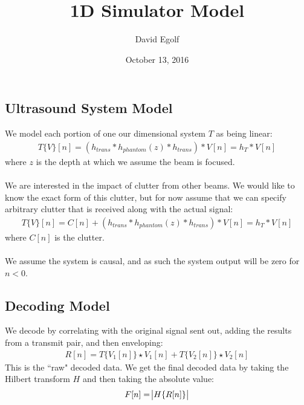 \documentclass[a4paper]{article}
\title{1D Simulator Model}
\author{David Egolf}
\date{October 13, 2016}
\newcommand{\op}[2]{#1\{#2\}}
\begin{document}
\subsection*{Ultrasound System Model}
We model each portion of one our dimensional system $T$ as being linear:
\begin{align*}
\op{T}{V}[n] = (h_{trans} * h_{phantom}(z) * h_{trans}) * V[n] = h_{T} * V[n]
\end{align*}
where $z$ is the depth at which we assume the beam is focused.
\\\\
We are interested in the impact of clutter from other beams. We would like to know the exact form of this clutter, but for now assume that we can specify arbitrary clutter that is received along with the actual signal:
\begin{align*}
\op{T}{V}[n] = C[n] +  (h_{trans} * h_{phantom}(z) * h_{trans}) * V[n] = h_{T} * V[n]
\end{align*}
where $C[n]$ is the clutter.
\\\\
We assume the system is causal, and as such the system output will be zero for $n < 0$.
\subsection*{Decoding Model}
We decode by correlating with the original signal sent out, adding the results from a transmit pair, and then enveloping:
\begin{align*}
R[n]=\op{T}{V_1[n]} \star V_1[n] + \op{T}{V_2[n]} \star V_2[n]
\end{align*}
This is the ``raw" decoded data. We get the final decoded data by taking the Hilbert transform $H$ and then taking the absolute value:
\begin{align*}
F[n] = \abs{\op{H}{R[n]}}
\end{align*}
\end{document}
